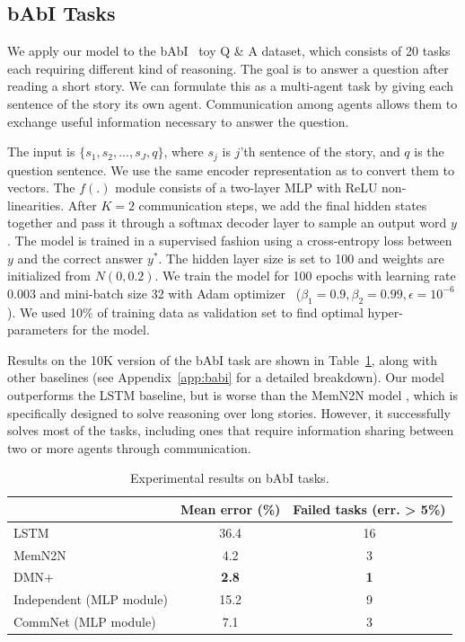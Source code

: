 \documentclass{article}
\newcommand{\tab}[1]{Table~\ref{tab:#1}}
\newcommand{\append}[1]{Appendix~\ref{app:#1}}
\begin{document}
\vspace{-3mm}
\subsection{bAbI Tasks}
\vspace{-3mm}
\label{sec:babi}
We apply our model to the bAbI~\cite{Weston15} toy Q \& A dataset, which
consists of 20 tasks each requiring different kind of reasoning. The goal
is to answer a question after reading a short story. We can
formulate this as a multi-agent task by giving each sentence of the
story its own agent. Communication among agents allows them to
exchange useful information necessary to answer the question.

The input is $\{s_1, s_2, ..., s_J, q\}$, where $s_j$ is $j$'th
sentence of the story, and $q$ is the question sentence. We use the same
encoder representation as \cite{end2endmemnn} to convert them to
vectors. The $f(.)$ module consists of a two-layer MLP with ReLU
non-linearities. After $K=2$ communication steps, we add the final 
hidden states together and pass it through a softmax decoder layer
to sample an output word $y$. The model is trained in a
supervised fashion using a cross-entropy loss between $y$ and the
correct answer $y^*$. The hidden layer size is set to 100 and weights are
initialized from $N(0,0.2)$. We train the model for 100 epochs with
learning rate 0.003 and mini-batch size 32 with Adam
optimizer~\cite{kingma2015} ($\beta_1=0.9, \beta_2=0.99,
\epsilon=10^{-6}$). We used 10\% of training data as validation set to
find optimal hyper-parameters for the model.



Results on the 10K version of the bAbI task are shown in \tab{babi},
along with other baselines (see \append{babi} for a detailed
breakdown). Our model outperforms the LSTM baseline, but is worse than
the MemN2N model \cite{end2endmemnn}, which is specifically designed
to solve reasoning over long stories. However, it successfully solves
most of the tasks, including ones that require information sharing
between two or more agents through communication.

\begin{table}[h]
\centering
\small
\begin{tabular}{|l|c|c|} 
\hline
                  & Mean error (\%) & Failed tasks (err. > 5\%) \\ \hline
LSTM~\cite{end2endmemnn}        & 36.4 & 16 \\ \hline
MemN2N~\cite{end2endmemnn}      & 4.2 &  3 \\ \hline
DMN+~\cite{XiongMS16}           & \textbf{2.8} &  \textbf{1} \\ \hline
Independent (MLP module)  & 15.2 &  9 \\ \hline
\hline
CommNet (MLP module)  & 7.1 &  3 \\ \hline
\end{tabular}
\caption{Experimental results on bAbI tasks.
}
\label{tab:babi}
\vspace{-3mm}
\end{table}
\end{document}
